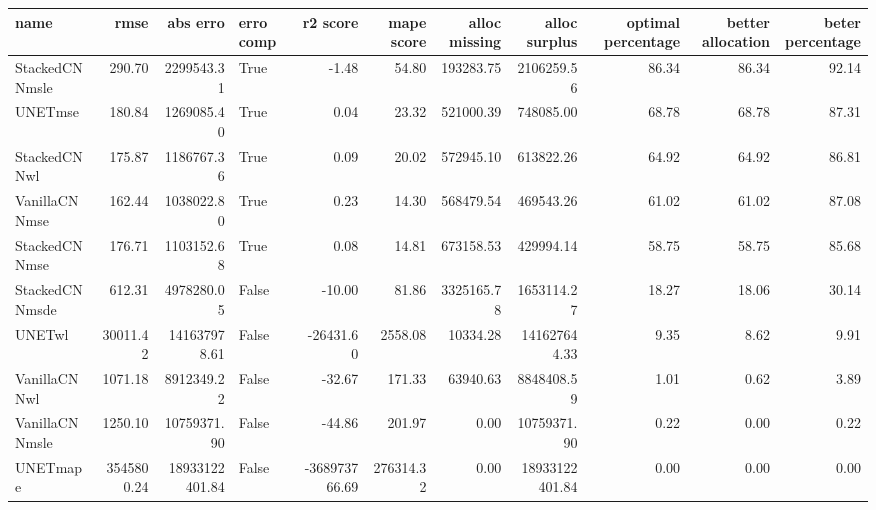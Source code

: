 \begin{tabular}{lrrlrrrrrrr}
\toprule
name & rmse & abs erro & erro comp & r2 score & mape score & alloc missing & alloc surplus & optimal percentage & better allocation & beter percentage \\
\midrule
StackedCNNmsle & 290.70 & 2299543.31 & True & -1.48 & 54.80 & 193283.75 & 2106259.56 & 86.34 & 86.34 & 92.14 \\
UNETmse & 180.84 & 1269085.40 & True & 0.04 & 23.32 & 521000.39 & 748085.00 & 68.78 & 68.78 & 87.31 \\
StackedCNNwl & 175.87 & 1186767.36 & True & 0.09 & 20.02 & 572945.10 & 613822.26 & 64.92 & 64.92 & 86.81 \\
VanillaCNNmse & 162.44 & 1038022.80 & True & 0.23 & 14.30 & 568479.54 & 469543.26 & 61.02 & 61.02 & 87.08 \\
StackedCNNmse & 176.71 & 1103152.68 & True & 0.08 & 14.81 & 673158.53 & 429994.14 & 58.75 & 58.75 & 85.68 \\
StackedCNNmsde & 612.31 & 4978280.05 & False & -10.00 & 81.86 & 3325165.78 & 1653114.27 & 18.27 & 18.06 & 30.14 \\
UNETwl & 30011.42 & 141637978.61 & False & -26431.60 & 2558.08 & 10334.28 & 141627644.33 & 9.35 & 8.62 & 9.91 \\
VanillaCNNwl & 1071.18 & 8912349.22 & False & -32.67 & 171.33 & 63940.63 & 8848408.59 & 1.01 & 0.62 & 3.89 \\
VanillaCNNmsle & 1250.10 & 10759371.90 & False & -44.86 & 201.97 & 0.00 & 10759371.90 & 0.22 & 0.00 & 0.22 \\
UNETmape & 3545800.24 & 18933122401.84 & False & -368973766.69 & 276314.32 & 0.00 & 18933122401.84 & 0.00 & 0.00 & 0.00 \\
\bottomrule
\end{tabular}
